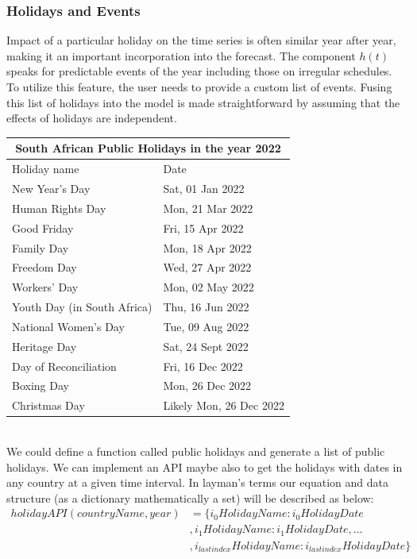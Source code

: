 \subsubsection{Holidays and Events}

Impact of a particular holiday on the time series is often similar year after year, making it an important incorporation into the forecast. The component $h(t)$ speaks for predictable events of the year including those on irregular schedules. To utilize this feature, the user needs to provide a custom list of events. Fusing this list of holidays into the model is made straightforward by assuming that the effects of holidays are independent.\\


\begin{tabular}{ |p{6cm}||p{6cm}|}
    \hline
    \multicolumn{2}{|c|}{South African Public Holidays in the year 2022} \\
    \hline
    Holiday name & Date\\
    \hline
    New Year’s Day &	Sat, 01 Jan 2022\\
    Human Rights Day &	Mon, 21 Mar 2022\\
    Good Friday &	Fri, 15 Apr 2022\\
    Family Day &	Mon, 18 Apr 2022\\
    Freedom Day &	Wed, 27 Apr 2022\\
    Workers’ Day &	Mon, 02 May 2022\\
    Youth Day (in South Africa) &	Thu, 16 Jun 2022\\
    National Women’s Day &	Tue, 09 Aug 2022\\
    Heritage Day & 	Sat, 24 Sept 2022\\
    Day of Reconciliation &	Fri, 16 Dec 2022\\
    Boxing Day &	Mon, 26 Dec 2022\\
    Christmas Day &	Likely Mon, 26 Dec 2022    \\
    \hline
\end{tabular} \\ 

We could define a function called public holidays and generate a list of public holidays. We can implement an API maybe also to get the holidays with dates in any country at a given time interval. In layman’s terms our equation and data structure (as a dictionary mathematically a set) will be described as below:
\begin{align*}
holidayAPI({countryName,year})&=\{i_0 HolidayName:i_0 HolidayDate \\
&,i_1 HolidayName:i_1HolidayDate,…\\
&,i_{lastindex} HolidayName:i_{lastindex} HolidayDate\}
\end{align*}\\

